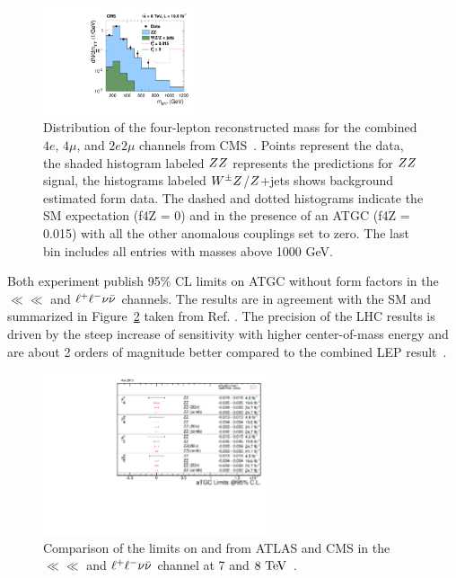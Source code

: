 \begin{figure}[htbp]
  \begin{center}
  \includegraphics[width=0.4\textwidth]{figures/sss-inclboson-diboson-zzprod-zzinvmass.pdf}
  \caption{ Distribution of the four-lepton reconstructed mass for the combined $4e$, $4\mu$, and $2e2\mu$ channels from CMS~\cite{CMS:2014xja}. Points represent the data, the shaded histogram labeled $ZZ$ represents the predictions for $ZZ$ signal, the histograms labeled $W^{\pm}Z$/$Z$+jets shows background estimated form data. The dashed and dotted histograms indicate the SM expectation (f4Z = 0) and in the presence of an ATGC (f4Z = 0.015) with all the other anomalous couplings set to zero. The last bin includes all entries with masses above 1000 GeV.
}
\label{fig:sss-inclboson-diboson-zzprod-zzinvmass}
\end{center}
\end{figure}

Both experiment publish 95\% CL limits on ATGC without form factors in the $\ll\ll$ 
and $\ell^+ \ell^-\nu\bar{\nu}$ channels. The results are in agreement with the SM and 
summarized in Figure~\ref{fig:sss-inclboson-diboson-zzprod-aTGC_naTGCf} 
taken from Ref. \cite{aTGCplots}. The precision of the LHC results is driven by the steep increase of 
sensitivity with higher center-of-mass energy
and are about 2 orders of magnitude better compared to the 
combined LEP result~\cite{LEP-comb-2002}.  
\begin{figure}[htbp]
  \begin{center}
  \includegraphics[width=0.6\textwidth]{figures/sss-inclboson-diboson-zzprod-aTGC_naTGCf.pdf}
  \caption{ Comparison of the limits on \ffourv{} and \ffivev{} from ATLAS and CMS in the $\ll\ll$ and $\ell^+ \ell^-\nu\bar{\nu}$
  channel at 7 and $8\TeV$~\cite{aTGCplots}.}
\label{fig:sss-inclboson-diboson-zzprod-aTGC_naTGCf}
\end{center}
\end{figure}







